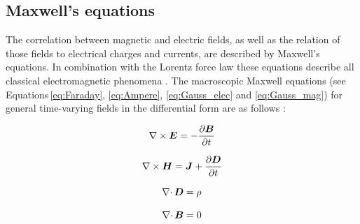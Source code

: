 \subsection{Maxwell's equations}
\label{subsec:Maxwell}
The correlation between magnetic and electric fields, as well as the relation of those fields to electrical charges and currents, are described by  Maxwell’s equations. In combination with the Lorentz force law these equations describe all classical electromagnetic phenomena \cite{meschede2015gerthsen}. The macroscopic Maxwell equations (see Equations\,\ref{eq:Faraday}, \ref{eq:Ampere}, \ref{eq:Gauss_elec} and \ref{eq:Gauss_mag}) for general time-varying fields in the differential form are as follows \cite{monk2003finite}: 

\begin{equation}
\label{eq:Faraday}
\centering
\nabla\times\boldsymbol{E} = -\frac{\partial\boldsymbol{B}}{\partial t}
\end{equation}

\begin{equation}
\label{eq:Ampere}
\centering
\nabla\times\boldsymbol{H} = \boldsymbol{J} + \frac{\partial\boldsymbol{D}}{\partial t}
\end{equation}

\begin{equation}
\label{eq:Gauss_elec}
\centering
\nabla\cdotp\boldsymbol{D} = \rho 
\end{equation}

\begin{equation}
\label{eq:Gauss_mag}
\centering
\nabla\cdotp\boldsymbol{B} = 0
\end{equation}

